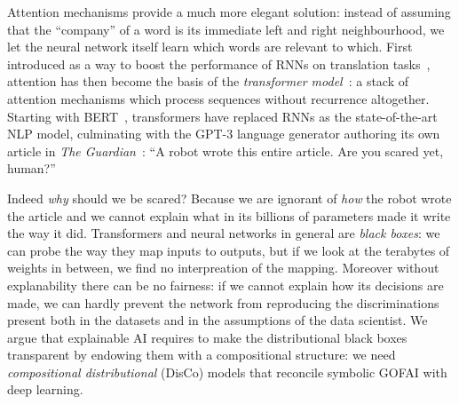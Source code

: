 Attention mechanisms provide a much more elegant solution: instead of assuming that the ``company'' of a word is its immediate left and right neighbourhood, we let the neural network itself learn which words are relevant to which.
First introduced as a way to boost the performance of RNNs on translation tasks~\cite{BahdanauEtAl16}, attention has then become the basis of the \emph{transformer model}~\cite{VaswaniEtAl17}: a stack of attention mechanisms which process sequences without recurrence altogether.
Starting with BERT~\cite{DevlinEtAl19}, transformers have replaced RNNs as the state-of-the-art NLP model, culminating with the GPT-3 language generator authoring its own article in \emph{The Guardian}~\cite{GPT-320}:
``A robot wrote this entire article. Are you scared yet, human?''

Indeed \emph{why} should we be scared?
Because we are ignorant of \emph{how} the robot wrote the article and we cannot explain what in its billions of parameters made it write the way it did.
Transformers and neural networks in general are \emph{black boxes}: we can probe the way they map inputs to outputs, but if we look at the terabytes of weights in between, we find no interpreation of the mapping.
Moreover without explanability there can be no fairness: if we cannot explain how its decisions are made, we can hardly prevent the network from reproducing the discriminations present both in the datasets and in the assumptions of the data scientist.
We argue that explainable AI requires to make the distributional black boxes transparent by endowing them with a compositional structure: we need \emph{compositional distributional} (DisCo) models that reconcile symbolic GOFAI with deep learning.

